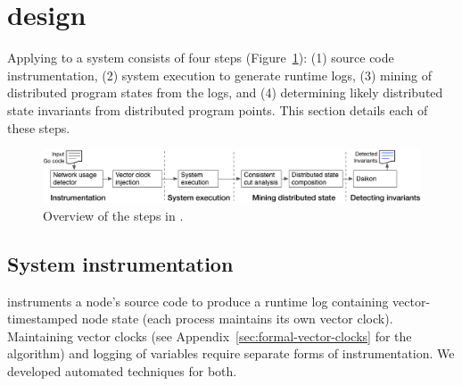 \section{\dinv design}
\label{sec:instrumentation}

Applying \dinv to a system consists of four steps
(Figure~\ref{fig:dinv-flow}): (1) source code instrumentation, (2) system
execution to generate runtime logs, (3) mining of distributed program
states from the logs, and (4) determining likely distributed state
invariants from distributed program points. This section details each
of these steps.

\begin{figure}[t]
\centering
    \includegraphics[width=.9\textwidth]{fig/dinv-flow.pdf}
    \caption{Overview of the steps in \dinv.}
    \label{fig:dinv-flow}
\end{figure}

\subsection{System instrumentation}
\label{sec:instrumentation}

\dinv instruments a node's source code to produce a runtime log
containing vector-timestamped node state (each process maintains its
own vector clock).
Maintaining vector clocks (see Appendix~\ref{sec:formal-vector-clocks}
for the algorithm) and logging of variables require separate forms of
instrumentation.  We developed automated techniques for both.


